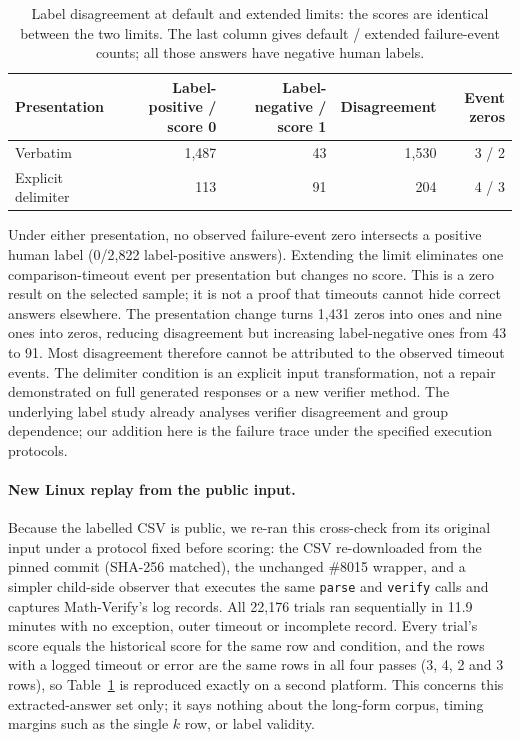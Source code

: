 \documentclass[10pt,a4paper]{article}
\newcommand{\mv}{Math-Verify}
\begin{document}
\begin{table}[h]
\centering\small
\begin{tabular}{@{}lrrrr@{}}
\toprule
Presentation & Label-positive / score 0 & Label-negative / score 1 & Disagreement & Event zeros \\
\midrule
Verbatim & 1,487 & 43 & 1,530 & 3 / 2 \\
Explicit delimiter & 113 & 91 & 204 & 4 / 3 \\
\bottomrule
\end{tabular}
\caption{Label disagreement at default and extended limits: the scores are
identical between the two limits. The last column gives default / extended
failure-event counts; all those answers have negative human labels.}
\label{tab:labels}
\end{table}

Under either presentation, no observed failure-event zero intersects a
positive human label (0/2,822 label-positive answers). Extending the limit
eliminates one comparison-timeout event per presentation but changes no
score. This is a zero result on the selected sample; it is not a proof that
timeouts cannot hide correct answers elsewhere. The presentation change
turns 1,431 zeros into ones and nine ones into zeros, reducing disagreement
but increasing label-negative ones from 43 to 91. Most disagreement
therefore cannot be attributed to the observed timeout events. The delimiter
condition is an explicit input transformation, not a repair demonstrated
on full generated responses or a new verifier method. The underlying label
study already analyses verifier disagreement and group dependence; our
addition here is the failure trace under the specified execution protocols.

\paragraph{New Linux replay from the public input.}
Because the labelled CSV is public, we re-ran this cross-check from its
original input under a protocol fixed before scoring: the CSV re-downloaded
from the pinned commit (SHA-256 matched), the unchanged \#8015 wrapper, and
a simpler child-side observer that executes the same \texttt{parse} and
\texttt{verify} calls and captures \mv{}'s log records. All 22,176 trials
ran sequentially in 11.9 minutes with no exception, outer timeout or
incomplete record. Every trial's score equals the historical score for the
same row and condition, and the rows with a logged timeout or error are the
same rows in all four passes (3, 4, 2 and 3 rows), so Table~\ref{tab:labels}
is reproduced exactly on a second platform. This concerns this
extracted-answer set only; it says nothing about the long-form corpus,
timing margins such as the single $k$ row, or label validity.
\end{document}
